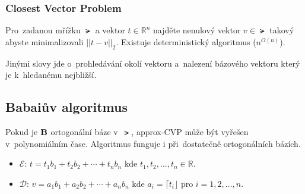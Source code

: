 \subsubsection{Closest Vector Problem}

Pro~zadanou mřížku $\lat$ a vektor $t \in \mathbb{R}^n$ najděte nenulový vektor $v \in \lat$ takový abyste minimalizovali $||t - v||_2$.
Existuje deterministický algoritmus ($n^{O(n)}$).

Jinými slovy jde o~prohledávání okolí vektoru a~nalezení bázového vektoru který je k~hledanému nejbližší.


\subsection{Babaiův algoritmus}

Pokud je $\text{\textbf{B}}$ ortogonální báze v~$\lat$, approx-CVP může být vyřešen v~polynomiálním čase.
Algoritmus funguje i při~dostatečně ortogonálních bázích.

\begin{itemize}
\item $\mathcal{E}$: $t = t_1 b_1 + t_2 b_2 + \cdots + t_n b_n$ kde $t_1, t_2, \dots, t_n \in \mathbb{R}$.
\item $\mathcal{D}$: $v = a_1 b_1 + a_2 b_2 + \cdots + a_n b_n$ kde $a_i = \lceil t_i \rfloor$ pro $i = 1, 2, \dots, n$.
\end{itemize}


